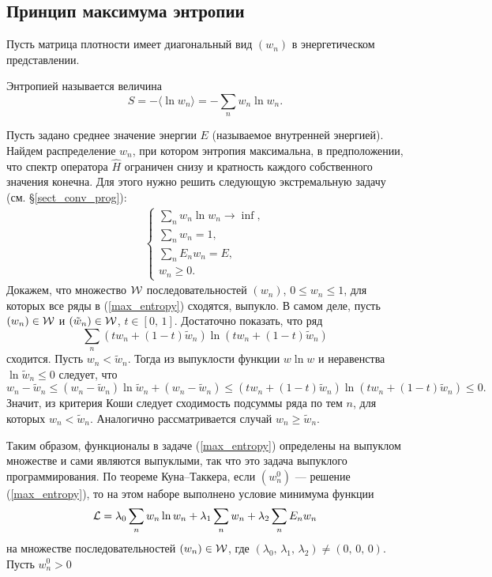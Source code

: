 \documentclass[a4paper
]{article}
\begin{document}
\subsection{Принцип максимума энтропии}
Пусть матрица плотности имеет диагональный вид $(w_n)$ в энергетическом
представлении.
\begin{Def}
Энтропией называется величина $$S=-\langle \ln w_n\rangle=-\sum \limits_n
w_n\ln w_n.$$
\end{Def}
Пусть задано среднее значение энергии $E$ (называемое внутренней энергией).
Найдем распределение $w_n$, при котором энтропия максимальна, в предположении,
что спектр оператора $\hat H$ ограничен снизу и кратность каждого собственного
значения конечна. Для этого нужно решить следующую экстремальную задачу (см.
\S \ref{sect_conv_prog}):
\begin{align}
\label{max_entropy}
\left\{ \begin{array}{l} \sum \limits_n w_n\ln w_n\rightarrow \inf, \\
\sum \limits_n w_n=1, \\ \sum \limits_n E_nw_n=E, \\ w_n\ge 0.\end{array}
\right.
\end{align}
Докажем, что множество ${\cal W}$ последовательностей $(w_n)$,
$0\le w_n\le 1$, для которых все ряды в (\ref{max_entropy})
сходятся, выпукло. В самом деле, пусть $(w_n)\in {\cal W}$ и
$(\tilde w_n)\in {\cal W}$, $t\in [0, \, 1]$. Достаточно показать,
что ряд $$\sum \limits_n (tw_n+(1-t)\tilde w_n)\ln
(tw_n+(1-t)\tilde w_n)$$ сходится. Пусть $w_n <\tilde w_n$. Тогда
из выпуклости функции $w\ln w$ и неравенства $\ln \tilde w_n\le 0$
следует, что $$w_n-\tilde w_n\le (w_n-\tilde w_n)\ln \tilde
w_n+(w_n-\tilde w_n)\le (tw_n+(1-t)\tilde w_n)\ln
(tw_n+(1-t)\tilde w_n)\le 0.$$
Значит, из критерия Коши следует сходимость подсуммы
ряда по тем $n$, для которых $w_n<\tilde w_n$. Аналогично
рассматривается случай $w_n\ge \tilde w_n$. \par Таким образом,
функционалы в задаче (\ref{max_entropy}) определены на выпуклом
множестве и сами являются выпуклыми, так что это задача выпуклого
программирования. По теореме Куна--Таккера, если $(w_n^0)$ ---
решение (\ref{max_entropy}), то на
этом наборе выполнено условие минимума функции $${\cal
L}=\lambda_0\sum \limits_n w_n\ln w_n+\lambda_1 \sum \limits_n
w_n+\lambda_2 \sum \limits_n E_nw_n$$ на множестве
последовательностей $(w_n)\in {\cal W}$, где $(\lambda_0,
\,\lambda_1, \, \lambda_2)\ne (0, \, 0, \, 0)$. Пусть $w_n^0>0$
\end{document}

